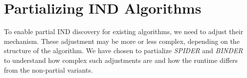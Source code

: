 \section{Partializing IND Algorithms}
To enable partial IND discovery for existing algorithms, we need to adjust their mechanism. These adjustment may be more or less complex, depending on the structure of the algorithm. We have chosen to partialize \textit{SPIDER} and \textit{BINDER} to understand how complex such adjustments are and how the runtime differs from the non-partial variants.

